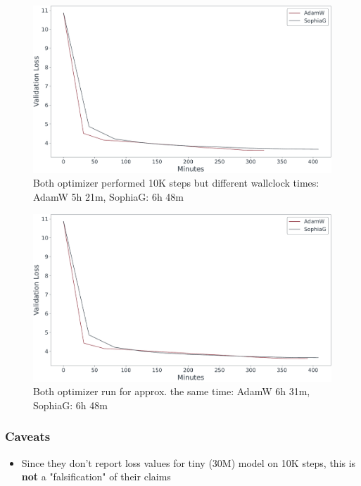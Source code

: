 \documentclass[
	11pt, %
	aspectratio=169, %
]{beamer}
\begin{document}
\begin{frame}[plain] %

	\begin{figure}
		\includegraphics[width=12cm]{../results/time_adam_sophia.pdf}
		\caption*{Both optimizer performed 10K steps but different wallclock times: AdamW 5h 21m, SophiaG: 6h 48m}
	\end{figure}
\end{frame}
\begin{frame}{} %

	\begin{figure}
		\includegraphics[width=12cm]{../results/time_adam_long_sophia.pdf}
		\caption*{Both optimizer run for approx. the same time: AdamW 6h 31m, SophiaG: 6h 48m}
	\end{figure}
\end{frame}

 \begin{frame}
 \frametitle{Caveats}
 \begin{itemize}
	\item Since they don't report loss values for tiny (30M) model on 10K steps, this is \textbf{not} a "falsification" of their claims
 \end{itemize}
 \begin{figure}
 \end{figure}
\end{frame}

\end{document}
